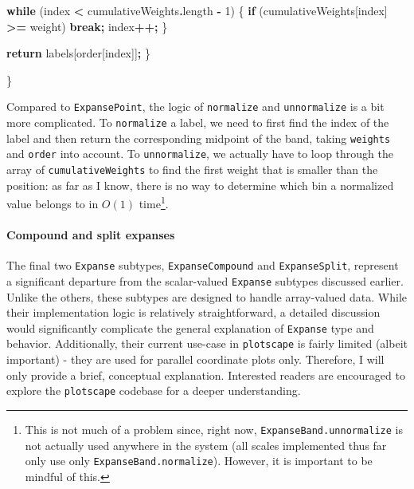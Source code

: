 \documentclass[
  openany]{book}
\newenvironment{Shaded}{\begin{snugshade}}{\end{snugshade}}
\newcommand{\AttributeTok}[1]{\textcolor[rgb]{0.13,0.29,0.53}{#1}}
\newcommand{\ControlFlowTok}[1]{\textcolor[rgb]{0.13,0.29,0.53}{\textbf{#1}}}
\newcommand{\DecValTok}[1]{\textcolor[rgb]{0.00,0.00,0.81}{#1}}
\newcommand{\NormalTok}[1]{#1}
\newcommand{\OperatorTok}[1]{\textcolor[rgb]{0.81,0.36,0.00}{\textbf{#1}}}
\theoremstyle{definition}
\theoremstyle{definition}
\theoremstyle{definition}
\theoremstyle{definition}
\theoremstyle{remark}
\begin{document}
\begin{Shaded}
\begin{Highlighting}[]
    \ControlFlowTok{while}\NormalTok{ (index }\OperatorTok{\textless{}}\NormalTok{ cumulativeWeights}\OperatorTok{.}\AttributeTok{length} \OperatorTok{{-}} \DecValTok{1}\NormalTok{) \{}
      \ControlFlowTok{if}\NormalTok{ (cumulativeWeights[index] }\OperatorTok{\textgreater{}=}\NormalTok{ weight) }\ControlFlowTok{break}\OperatorTok{;}
\NormalTok{      index}\OperatorTok{++;}
\NormalTok{    \}}

    \ControlFlowTok{return}\NormalTok{ labels[order[index]]}\OperatorTok{;}
\NormalTok{  \}}

\NormalTok{\}}
\end{Highlighting}
\end{Shaded}

Compared to \texttt{ExpansePoint}, the logic of \texttt{normalize} and \texttt{unnormalize} is a bit more complicated. To \texttt{normalize} a label, we need to first find the index of the label and then return the corresponding midpoint of the band, taking \texttt{weights} and \texttt{order} into account. To \texttt{unnormalize}, we actually have to loop through the array of \texttt{cumulativeWeights} to find the first weight that is smaller than the position: as far as I know, there is no way to determine which bin a normalized value belongs to in \(O(1)\) time\footnote{This is not much of a problem since, right now, \texttt{ExpanseBand.unnormalize} is not actually used anywhere in the system (all scales implemented thus far only use only \texttt{ExpanseBand.normalize}). However, it is important to be mindful of this.}.

\paragraph{Compound and split expanses}\label{compound-and-split-expanses}

The final two \texttt{Expanse} subtypes, \texttt{ExpanseCompound} and \texttt{ExpanseSplit}, represent a significant departure from the scalar-valued \texttt{Expanse} subtypes discussed earlier. Unlike the others, these subtypes are designed to handle array-valued data. While their implementation logic is relatively straightforward, a detailed discussion would significantly complicate the general explanation of \texttt{Expanse} type and behavior. Additionally, their current use-case in \texttt{plotscape} is fairly limited (albeit important) - they are used for parallel coordinate plots only. Therefore, I will only provide a brief, conceptual explanation. Interested readers are encouraged to explore the \texttt{plotscape} codebase for a deeper understanding.
\end{document}
